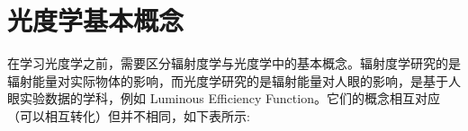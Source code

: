 \documentclass[UTF8]{report}
\theoremstyle{MyLineTheoremStyle} %
\theoremstyle{MyBlockTheoremStyle} %
\theoremstyle{MySubsubsectionStyle} %
\begin{document}
\section{光度学基本概念}

在学习光度学之前，需要区分辐射度学与光度学中的基本概念。辐射度学研究的是辐射能量对实际物体的影响，而光度学研究的是辐射能量对人眼的影响，是基于人眼实验数据的学科，例如 Luminous Efficiency Function。它们的概念相互对应（可以相互转化）但并不相同，如下表所示: 
\begin{table}[H]\centering
    \caption{光度学与辐射度学概念对应关系}
    \label{光度学与辐射度学概念对应关系}
\end{table}
\end{document}
